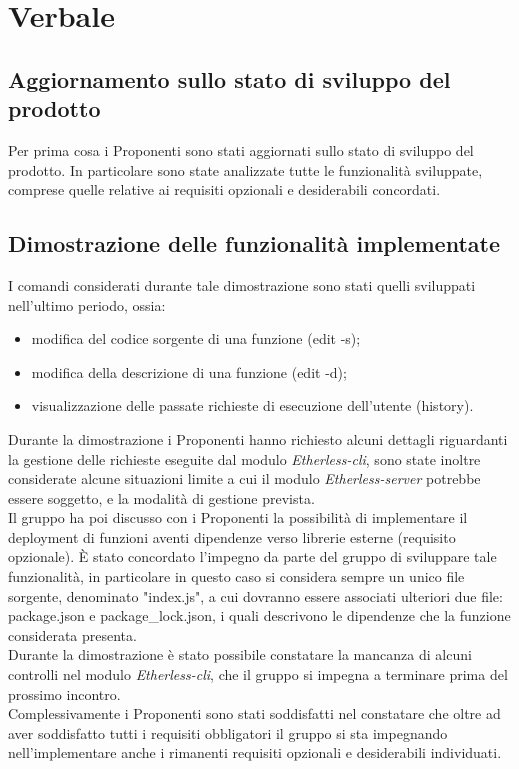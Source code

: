 \section{Verbale}
\subsection{Aggiornamento sullo stato di sviluppo del prodotto}
Per prima cosa i Proponenti sono stati aggiornati sullo stato di sviluppo del prodotto. In particolare sono state analizzate tutte le funzionalità sviluppate, comprese quelle relative ai requisiti opzionali e desiderabili concordati. 

\subsection{Dimostrazione delle funzionalità implementate}
I comandi considerati durante tale dimostrazione sono stati quelli sviluppati nell'ultimo periodo, ossia:
\begin{itemize}
	\item modifica del codice sorgente di una funzione (edit -s); 
	\item modifica della descrizione di una funzione (edit -d); 
	\item visualizzazione delle passate richieste di esecuzione dell'utente (history).
\end{itemize}
Durante la dimostrazione i Proponenti hanno richiesto alcuni dettagli riguardanti la gestione delle richieste eseguite dal modulo \textit{Etherless-cli}, sono state inoltre considerate alcune situazioni limite a cui il modulo \textit{Etherless-server} potrebbe essere soggetto, e la modalità di gestione prevista. \\ 
Il gruppo ha poi discusso con i Proponenti la possibilità di implementare il deployment di funzioni aventi dipendenze verso librerie esterne (requisito opzionale). È stato concordato l'impegno da parte del gruppo di sviluppare tale funzionalità, in particolare in questo caso si considera sempre un unico file sorgente, denominato "index.js", a cui dovranno essere associati ulteriori due file: package.json e package\_lock.json, i quali descrivono le dipendenze che la funzione considerata presenta. \\
Durante la dimostrazione è stato possibile constatare la mancanza di alcuni controlli nel modulo \textit{Etherless-cli}, che il gruppo si impegna a terminare prima del prossimo incontro. \\ 
Complessivamente i Proponenti sono stati soddisfatti nel constatare che oltre ad aver soddisfatto tutti i requisiti obbligatori il gruppo si sta impegnando nell'implementare anche i rimanenti requisiti opzionali e desiderabili individuati. 

